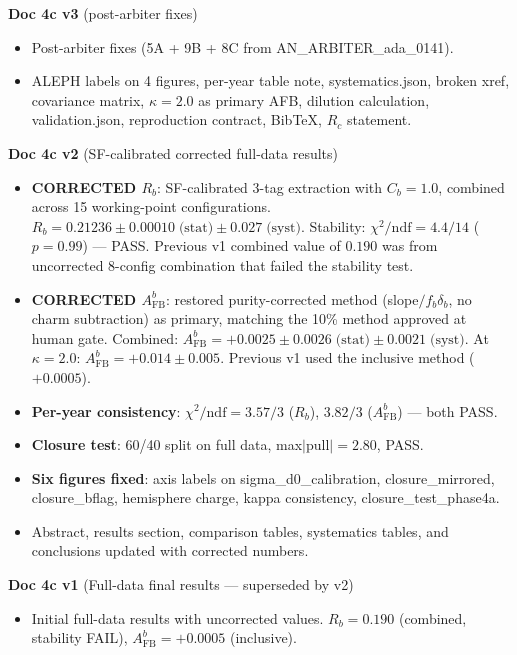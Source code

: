 \documentclass[11pt,a4paper]{article}
\begin{document}
\textbf{Doc 4c v3} (post-arbiter fixes)
\begin{itemize}
\item Post-arbiter fixes (5A + 9B + 8C from AN\_ARBITER\_ada\_0141).
\item ALEPH labels on 4 figures, per-year table note, systematics.json,
  broken xref, covariance matrix, $\kappa = 2.0$ as primary AFB, dilution
  calculation, validation.json, reproduction contract, BibTeX, $R_c$ statement.
\end{itemize}

\textbf{Doc 4c v2} (SF-calibrated corrected full-data results)
\begin{itemize}
\item \textbf{CORRECTED $R_b$}: SF-calibrated 3-tag extraction with $C_b = 1.0$,
  combined across 15 working-point configurations.
  $R_b = 0.21236 \pm 0.00010\;\text{(stat)} \pm 0.027\;\text{(syst)}$.
  Stability: $\chi^2/\text{ndf} = 4.4/14$ ($p = 0.99$) --- PASS.
  Previous v1 combined value of $0.190$ was from uncorrected 8-config
  combination that failed the stability test.
\item \textbf{CORRECTED $A_\text{FB}^b$}: restored purity-corrected method
  (slope$/f_b \delta_b$, no charm subtraction) as primary, matching
  the 10\% method approved at human gate.
  Combined: $A_\text{FB}^b = +0.0025 \pm 0.0026\;\text{(stat)}
  \pm 0.0021\;\text{(syst)}$.
  At $\kappa = 2.0$: $A_\text{FB}^b = +0.014 \pm 0.005$.
  Previous v1 used the inclusive method ($+0.0005$).
\item \textbf{Per-year consistency}: $\chi^2/\text{ndf} = 3.57/3$ ($R_b$),
  $3.82/3$ ($A_\text{FB}^b$) --- both PASS.
\item \textbf{Closure test}: 60/40 split on full data, max$|$pull$| = 2.80$, PASS.
\item \textbf{Six figures fixed}: axis labels on sigma\_d0\_calibration,
  closure\_mirrored, closure\_bflag, hemisphere charge, kappa consistency,
  closure\_test\_phase4a.
\item Abstract, results section, comparison tables, systematics tables,
  and conclusions updated with corrected numbers.
\end{itemize}

\textbf{Doc 4c v1} (Full-data final results --- superseded by v2)
\begin{itemize}
\item Initial full-data results with uncorrected values.
  $R_b = 0.190$ (combined, stability FAIL), $A_\text{FB}^b = +0.0005$ (inclusive).
\end{itemize}
\end{document}
